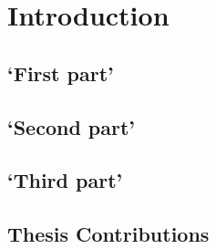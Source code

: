 \chapter{Introduction}\label{ch1-intro}

\section{`First part'}

\section{`Second part'}

\section{`Third part'}


\section{Thesis Contributions}


